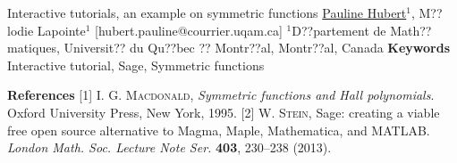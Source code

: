 \begin{abstract_online}{Interactive tutorials, an example on symmetric functions}{%
        \underline{Pauline Hubert}$^{1}$, M??lodie Lapointe$^{1}$ }{[hubert.pauline@courrier.uqam.ca]
        }{%
        $^1$D??partement de Math??matiques, Universit?? du Qu??bec ?? Montr??al, Montr??al, Canada}
\textbf{Keywords} \newline{} Interactive tutorial, Sage, Symmetric functions

\textbf{References} \newline{}
[1] \textsc{I. G. Macdonald}, \emph{Symmetric functions and Hall polynomials}. Oxford University Press, New York, 1995. \newline{}
[2] \textsc{W. Stein}, Sage: creating a viable free open source alternative to Magma, Maple, Mathematica, and MATLAB. \emph{London Math. Soc. Lecture Note Ser.} \textbf{403}, 230--238  (2013). \newline{}
\end{abstract_online}
    